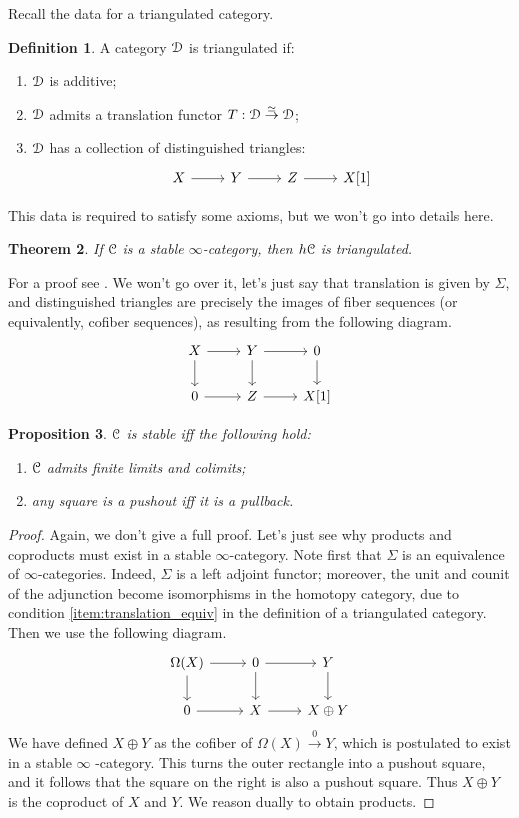 \documentclass[10pt,a4paper,reqno,oneside]{book} %
\theoremstyle{plain}
\newtheorem{thm}{Theorem}[section]
\newtheorem{prop}[thm]{Proposition}
\theoremstyle{definition}
\newtheorem{defin}[thm]{Definition}
\theoremstyle{remark}
\numberwithin{equation}{section}
\begin{document}
Recall the data for a triangulated category.

\begin{defin}
A category $\mathcal D$ is triangulated if:
\begin{enumerate}
\item $\mathcal D$ is additive;
\item \label{item:translation_equiv}
 $\mathcal D$ admits a translation functor $T : \mathcal D \overset{\simeq}{\to} \mathcal D$;
\item $\mathcal D$ has a collection of distinguished triangles:
\[
\begin{tikzcd}
X\arrow{r} & Y \arrow{r} & Z \arrow{r} & X[1]
\end{tikzcd}
\]
\end{enumerate}
This data is required to satisfy some axioms, but we won't go into details here.
\end{defin}

\begin{thm}
\label{thm:stable_triang}
If $\mathcal C$ is a stable $\infty$-category, then $h\mathcal C$ is triangulated.
\end{thm}

For a proof see \cite{Lurie_Higher_algebra}. We won't go over it, let's just say that translation is given by $\Sigma$,
and distinguished triangles are precisely the images of fiber sequences (or equivalently, cofiber sequences), as resulting
from the following diagram.
\[
\begin{tikzcd}
X\arrow{r}\arrow{d} & Y \arrow{r}\arrow{d} & 0\arrow{d} \\
0\arrow{r} & Z \arrow{r} & X[1]
\end{tikzcd}
\]

\begin{prop}
$\mathcal C$ is stable iff the following hold:
\begin{enumerate}
\item $\mathcal C$ admits finite limits and colimits;
\item any square is a pushout iff it is a pullback.
\end{enumerate}
\end{prop}
\begin{proof}
Again, we don't give a full proof. Let's just see why products and coproducts must exist in a stable $\infty$-category. 
Note first that $\Sigma$ is an equivalence of
$\infty$-categories. Indeed, $\Sigma$ is a left adjoint functor; moreover, the unit and counit of the adjunction become 
isomorphisms in the homotopy category, due to condition \ref{item:translation_equiv} in the definition of a triangulated
category. Then we use the following diagram.
\[
\begin{tikzcd}
\Omega(X)\arrow{d}\arrow{r} & 0\arrow{d}\arrow{r} & Y\arrow{d} \\
0\arrow{r} & X\arrow{r} & X \oplus Y
\end{tikzcd}
\]
We have defined $X \oplus Y$ as the cofiber of $\Omega(X) \overset{0}{\to} Y$, which is postulated to exist in a stable $\infty$
-category. This turns the outer rectangle into a pushout square, and it follows that the square on the right is also a pushout
square. Thus $X\oplus Y$ is the coproduct of $X$ and $Y$. We reason dually to obtain products.
\end{proof}
\end{document}
